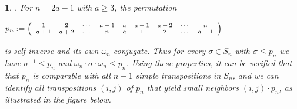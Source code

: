 \documentclass[a4 paper,12pt]{article}
\newcommand{\ma}{\leqslant}
\newtheorem{numeris}{}[section]
\begin{document}
\begin{numeris}.  For  $n= 2a-1$ with $a\geq 3$, the permutation 
\begin{center}
$p_n :=\begin{scriptsize}  \left(
\begin{array}{ccccccccc}
	1 & 2 & \cdots & a-1 & a & a+1& a+2 & \cdots & n\\
	a+1 & a+2 & \cdots & n & a & 1& 2 & \cdots & a-1
\end{array}
\right) \end{scriptsize}$
\end{center}
is self-inverse and its own  $\omega_n$-conjugate. Thus for every $\sigma\in S_n$ with $\sigma\ma p_n$ we have $\sigma^{-1}\ma p_n$ and $\omega_n\cdot \sigma \cdot \omega_n \ma p_n$. Using these properties, it can be verified that that $p_n$ is comparable with all $n-1$ simple transpositions in $S_{n}$, and  we can identify all transpositions $(i,j)$ of $p_n$ 
that yield \textit{small neighbors} $(i,j)\cdot p_n$,
as illustrated in the figure below.\\




\end{numeris}
\end{document}
